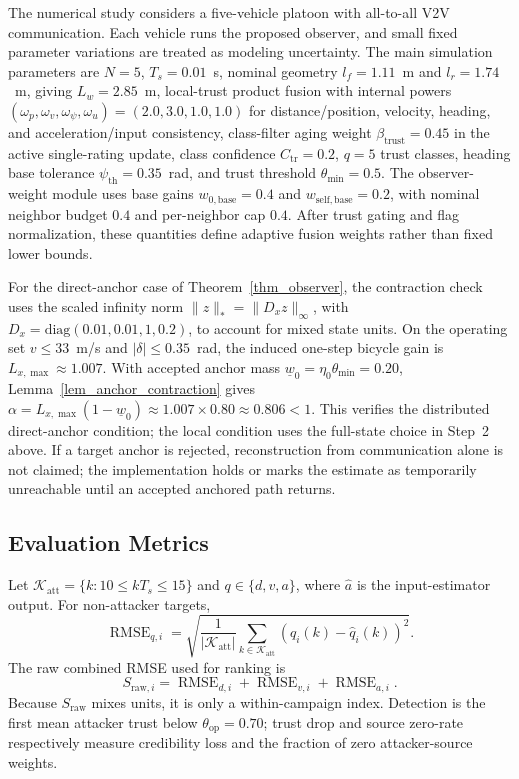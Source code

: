 \documentclass[letterpaper,journal]{IEEEtran}
\begin{document}
The numerical study considers a five-vehicle platoon with all-to-all V2V communication. Each vehicle runs the proposed observer, and small fixed parameter variations are treated as modeling uncertainty. The main simulation parameters are $N=5$, $T_s=0.01$~s, nominal geometry $l_f=1.11$~m and $l_r=1.74$~m, giving $L_w=2.85$~m, local-trust product fusion with internal powers $(\omega_p,\omega_v,\omega_\psi,\omega_u)=(2.0,3.0,1.0,1.0)$ for distance/position, velocity, heading, and acceleration/input consistency, class-filter aging weight $\beta_{\text{trust}}=0.45$ in the active single-rating update, class confidence $C_{\mathrm{tr}}=0.2$, $q=5$ trust classes, heading base tolerance $\psi_{\mathrm{th}}=0.35$~rad, and trust threshold $\theta_{\min}=0.5$. The observer-weight module uses base gains $w_{0,\mathrm{base}}=0.4$ and $w_{\mathrm{self,base}}=0.2$, with nominal neighbor budget $0.4$ and per-neighbor cap $0.4$. After trust gating and flag normalization, these quantities define adaptive fusion weights rather than fixed lower bounds.

For the direct-anchor case of Theorem~\ref{thm_observer}, the contraction check uses the scaled infinity norm $\|z\|_*=\|D_xz\|_\infty$, with $D_x=\mathrm{diag}(0.01,0.01,1,0.2)$, to account for mixed state units. On the operating set $v\le33$~m/s and $|\delta|\le0.35$~rad, the induced one-step bicycle gain is $L_{x,\max}\approx1.007$. With accepted anchor mass $\underline w_0=\eta_0\theta_{\min}=0.20$, Lemma~\ref{lem_anchor_contraction} gives $\alpha=L_{x,\max}(1-\underline w_0)\approx1.007\times0.80\approx0.806<1$. This verifies the distributed direct-anchor condition; the local condition uses the full-state choice in Step~2 above. If a target anchor is rejected, reconstruction from communication alone is not claimed; the implementation holds or marks the estimate as temporarily unreachable until an accepted anchored path returns.

\subsection{Evaluation Metrics}
Let $\mathcal K_{\mathrm{att}}=\{k:10\le kT_s\le15\}$ and $q\in\{d,v,a\}$, where $\hat a$ is the input-estimator output. For non-attacker targets,
\begin{equation}
\operatorname{RMSE}_{q,i}=
\sqrt{\frac{1}{|\mathcal K_{\mathrm{att}}|}\sum_{k\in\mathcal K_{\mathrm{att}}}
\left(q_i(k)-\hat q_i(k)\right)^2}.
\end{equation}
The raw combined RMSE used for ranking is
\begin{equation}
S_{\mathrm{raw},i}
=\operatorname{RMSE}_{d,i}+\operatorname{RMSE}_{v,i}
+\operatorname{RMSE}_{a,i}.
\end{equation}
Because $S_{\mathrm{raw}}$ mixes units, it is only a within-campaign index. Detection is the first mean attacker trust below $\theta_{\mathrm{op}}=0.70$; trust drop and source zero-rate respectively measure credibility loss and the fraction of zero attacker-source weights.
\end{document}
